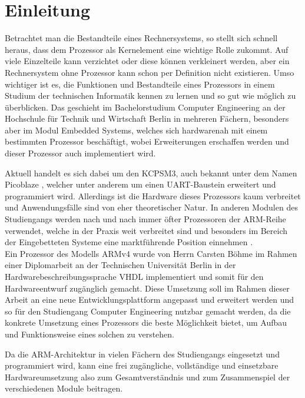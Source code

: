 \documentclass[11pt,a4paper,titlepage]{article}
\begin{document}
\newpage



\section{Einleitung}

Betrachtet man die Bestandteile eines Rechnersystems, so stellt sich schnell heraus, dass dem Prozessor als Kernelement eine wichtige Rolle zukommt. Auf viele Einzelteile kann verzichtet oder diese können verkleinert werden, aber ein Rechnersystem ohne Prozessor kann schon per Definition nicht existieren. Umso wichtiger ist es, die Funktionen und Bestandteile eines Prozessors in einem Studium der technischen Informatik kennen zu lernen und so gut wie möglich zu überblicken. Das geschieht im Bachelorstudium Computer Engineering an der Hochschule für Technik und Wirtschaft Berlin in mehreren Fächern, besonders aber im Modul Embedded Systems, welches sich hardwarenah mit einem bestimmten Prozessor beschäftigt, wobei Erweiterungen erschaffen werden und dieser Prozessor auch implementiert wird.

Aktuell handelt es sich dabei um den KCPSM3, auch bekannt unter dem Namen Picoblaze \cite{Picoblaze}, welcher unter anderem um einen UART-Baustein erweitert und programmiert wird. Allerdings ist die Hardware dieses Prozessors kaum verbreitet und Anwendungsfälle sind von eher theoretischer Natur. In anderen Modulen des Studiengangs werden nach und nach immer öfter Prozessoren der ARM-Reihe verwendet, welche in der Praxis weit verbreitet sind und besonders im Bereich der Eingebetteten Systeme eine marktführende Position einnehmen \cite{ARMMarkt}.\\

Ein Prozessor des Modells ARMv4 wurde von Herrn Carsten Böhme im Rahmen einer Diplomarbeit an der Technischen Universität Berlin in der Hardwarebeschreibungssprache VHDL implementiert und somit für den Hardwareentwurf zugänglich gemacht. Diese Umsetzung soll im Rahmen dieser Arbeit an eine neue Entwicklungsplattform angepasst und erweitert werden und so für den Studiengang Computer Engineering nutzbar gemacht werden, da die konkrete Umsetzung eines Prozessors die beste Möglichkeit bietet, um Aufbau und Funktionsweise eines solchen zu verstehen. 

Da die ARM-Architektur in vielen Fächern des Studiengangs eingesetzt und programmiert wird, kann eine frei zugängliche, vollständige und einsetzbare Hardwareumsetzung also zum Gesamtverständnis und zum Zusammenspiel der verschiedenen Module beitragen.
\end{document}
